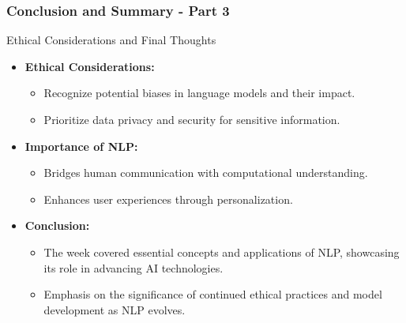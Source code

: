 \documentclass[aspectratio=169]{beamer}
\begin{document}
\begin{frame}[fragile]
    \frametitle{Conclusion and Summary - Part 3}
    \begin{block}{Ethical Considerations and Final Thoughts}
        \begin{itemize}
            \item \textbf{Ethical Considerations:}
            \begin{itemize}
                \item Recognize potential biases in language models and their impact.
                \item Prioritize data privacy and security for sensitive information.
            \end{itemize}
            
            \item \textbf{Importance of NLP:}
            \begin{itemize}
                \item Bridges human communication with computational understanding.
                \item Enhances user experiences through personalization.
            \end{itemize}

            \item \textbf{Conclusion:}
            \begin{itemize}
                \item The week covered essential concepts and applications of NLP, showcasing its role in advancing AI technologies.
                \item Emphasis on the significance of continued ethical practices and model development as NLP evolves.
            \end{itemize}
        \end{itemize}
    \end{block}
\end{frame}
\end{document}
